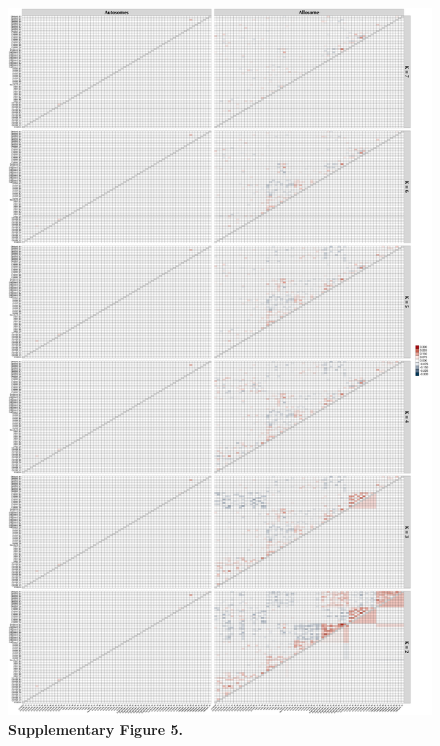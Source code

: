 \documentclass[twoside, british, a4paper]{article}
\begin{document}
\begin{figure}
\centering
\includegraphics[width=.85\textwidth]{../Y150239Genomics--Pipeline/Y150239Genomics--Plots/Y150239Genomics--ngsAdmix/Y150239Genomics--evalAdmix.pdf}
\captionsetup{labelformat=empty}
\caption[\textbf{Supplementary Figure 5.}]{\textbf{Supplementary Figure 5.} }
\label{SI:Y150239Genomics--evalAdmix}
\end{figure}
\end{document}
